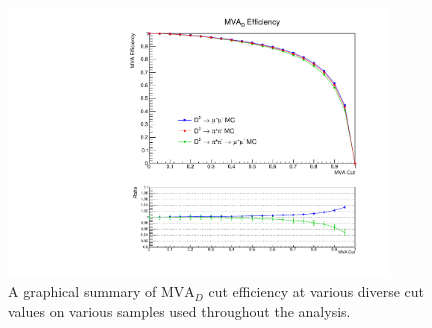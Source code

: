 \begin{figure}[H]
    \begin{center}
      \includegraphics[width=0.9\textwidth]{figures/chapter4/mva/mva_efficiency.pdf}
    \end{center}
    \caption{
      A graphical summary of $\text{MVA}_D$ cut efficiency at various diverse cut values on various samples used throughout the analysis.
    }
    \label{fig:mva_cut_efficiencies}
\end{figure}

